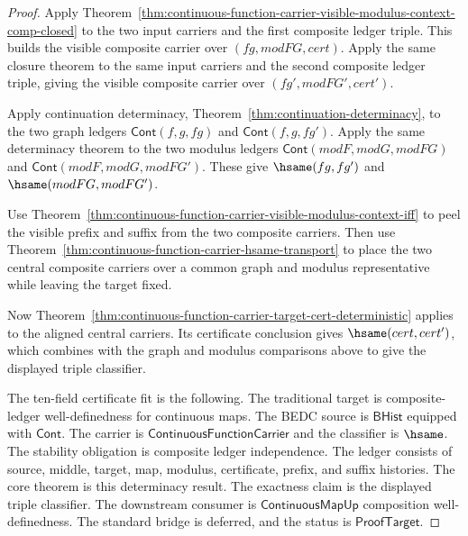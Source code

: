 \begin{proof}
Apply Theorem~\ref{thm:continuous-function-carrier-visible-modulus-context-comp-closed}
to the two input carriers and the first composite ledger triple. This builds the
visible composite carrier over $(fg,modFG,cert)$. Apply the same closure theorem
to the same input carriers and the second composite ledger triple, giving the
visible composite carrier over $(fg',modFG',cert')$.

Apply continuation determinacy, Theorem~\ref{thm:continuation-determinacy}, to
the two graph ledgers $\mathsf{Cont}(f,g,fg)$ and
$\mathsf{Cont}(f,g,fg')$. Apply the same determinacy theorem to the two modulus
ledgers $\mathsf{Cont}(modF,modG,modFG)$ and
$\mathsf{Cont}(modF,modG,modFG')$. These give $\hsame(fg,fg')$ and
$\hsame(modFG,modFG')$.

Use Theorem~\ref{thm:continuous-function-carrier-visible-modulus-context-iff}
to peel the visible prefix and suffix from the two composite carriers. Then use
Theorem~\ref{thm:continuous-function-carrier-hsame-transport} to place the two
central composite carriers over a common graph and modulus representative while
leaving the target fixed.

Now Theorem~\ref{thm:continuous-function-carrier-target-cert-deterministic}
applies to the aligned central carriers. Its certificate conclusion gives
$\hsame(cert,cert')$, which combines with the graph and modulus comparisons
above to give the displayed triple classifier.

The ten-field certificate fit is the following. The traditional target is
composite-ledger well-definedness for continuous maps. The BEDC source is
$\mathsf{BHist}$ equipped with $\mathsf{Cont}$. The carrier is
$\mathsf{ContinuousFunctionCarrier}$ and the classifier is $\hsame$. The
stability obligation is composite ledger independence. The ledger consists of
source, middle, target, map, modulus, certificate, prefix, and suffix histories.
The core theorem is this determinacy result. The exactness claim is the
displayed triple classifier. The downstream consumer is
$\mathsf{ContinuousMapUp}$ composition well-definedness. The standard bridge is
deferred, and the status is $\mathsf{ProofTarget}$.
\end{proof}

